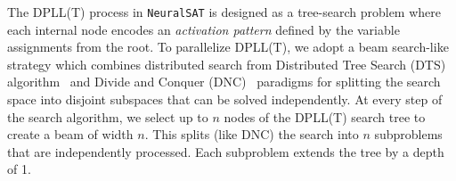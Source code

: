 \documentclass[oneside,11pt,dvipsnames]{book}
\numberwithin{equation}{section}
\theoremstyle{definition}
\theoremstyle{remark}
\newcommand{\tvn}[1]{\iftoggle{usecomment}{{\color{red}{[TVN]: #1}}}{}}
\newcommand{\hd}[1]{\iftoggle{usecomment}{{\color{blue}{[HD]: #1}}}{}}
\newcommand{\tool}{\texttt{NeuralSAT}}
\begin{document}

The DPLL(T) process in \tool{} is designed as a tree-search problem where each internal node encodes an \textit{activation pattern} defined by the variable assignments from the root.
To parallelize DPLL(T), we adopt a beam search-like strategy which combines distributed search from Distributed Tree Search (DTS) algorithm~\cite{ferguson1988distributed} and Divide and Conquer (DNC)~\cite{le2017painless} paradigms for splitting the search space into disjoint subspaces that can be solved independently.
At every step of the search algorithm, we select up to $n$ nodes  of the DPLL(T) search tree to create a beam of width $n$.
This splits (like DNC) the search into $n$ subproblems that are independently processed.  Each subproblem extends the tree by a depth of 1.
\end{document}

